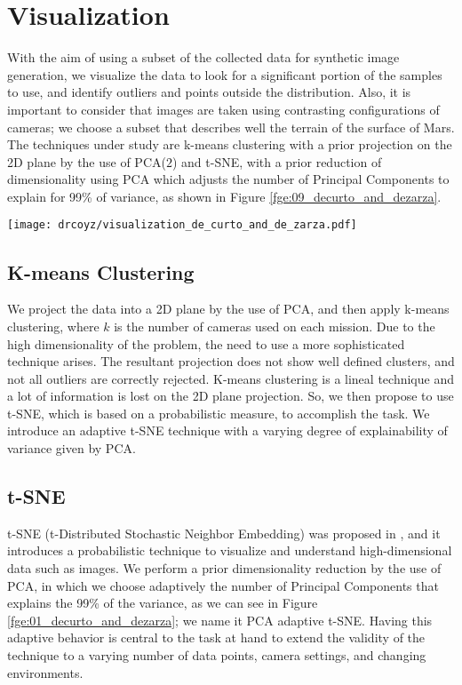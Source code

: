 \documentclass[lettersize,journal]{IEEEtran}
\begin{document}
\section{Visualization}
\label{sn:tsne}
With the aim of using a subset of the collected data for synthetic image generation, we visualize the data to look for a significant portion of the samples to use, and identify outliers and points outside the distribution. Also, it is important to consider that images are taken using contrasting configurations of cameras; we choose a subset that describes well the terrain of the surface of Mars. The techniques under study are k-means clustering with a prior projection on the 2D plane by the use of PCA($2$) and t-SNE, with a prior reduction of dimensionality using PCA which adjusts the number of Principal Components to explain for 99\% of variance, as shown in Figure \ref{fge:09_decurto_and_dezarza}.


\begin{figure*}[ht]
\centering
\texttt{[image: drcoyz/visualization\_de\_curto\_and\_de\_zarza.pdf]}
\caption{Visualization pipeline under study.}
\label{fge:09_decurto_and_dezarza}
\end{figure*}

\subsection{K-means Clustering}
We project the data into a 2D plane by the use of PCA, and then apply k-means clustering, where $k$ is the number of cameras used on each mission. Due to the high dimensionality of the problem, the need to use a more sophisticated technique arises. The resultant projection does not show well defined clusters, and not all outliers are correctly rejected. K-means clustering is a lineal technique and a lot of information is lost on the 2D plane projection. So, we then propose to use t-SNE, which is based on a probabilistic measure, to accomplish the task. We introduce an adaptive t-SNE technique with a varying degree of explainability of variance given by PCA.

\subsection{t-SNE}
t-SNE (t-Distributed Stochastic Neighbor Embedding) was proposed in \cite{vandermaaten08a}, and it introduces a probabilistic technique to visualize and understand high-dimensional data such as images. We perform a prior dimensionality reduction by the use of PCA, in which we choose adaptively the number of Principal Components that explains the 99\% of the variance, as we can see in Figure \ref{fge:01_decurto_and_dezarza}; we name it PCA adaptive t-SNE. Having this adaptive behavior is central to the task at hand to extend the validity of the technique to a varying number of data points, camera settings, and changing environments.
\end{document}
